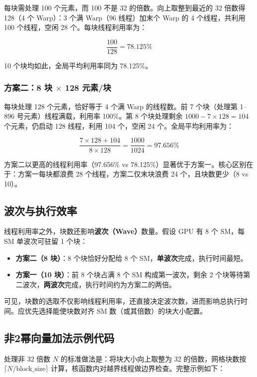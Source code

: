 每块需处理 100 个元素，而 100 不是 32 的倍数。向上取整到最近的 32 倍数得 128（4 个 Warp）：3 个满 Warp（96 线程）加末个 Warp 的 4 个线程，共利用 100 个线程，空闲 28 个。每块线程利用率为：

\[
\frac{100}{128} = 78.125\%
\]

10 个块均如此，全局平均利用率同为 78.125\%。

\subsubsection{方案二：8 块 $\times$ 128 元素/块}

每块处理 128 个元素，恰好等于 4 个满 Warp 的线程数。前 7 个块（处理第 1--896 号元素）线程满载，利用率 100\%。第 8 个块处理剩余 $1000 - 7 \times 128 = 104$ 个元素，仍启动 128 线程，利用 104 个，空闲 24 个。全局平均利用率为：

\[
\frac{7 \times 128 + 104}{8 \times 128} = \frac{1000}{1024} = 97.656\%
\]

方案二以更高的线程利用率（97.656\% vs 78.125\%）显著优于方案一。核心区别在于：方案一每块都浪费 28 个线程，方案二仅末块浪费 24 个，且块数更少（8 vs 10）。

\subsection{波次与执行效率}

线程利用率之外，块数还影响\textbf{波次（Wave）}数量。假设 GPU 有 8 个 SM，每 SM 单波次可驻留 1 个块：

\begin{itemize}
    \item \textbf{方案二（8 块）}：8 个块恰好分配给 8 个 SM，\textbf{单波次}完成，执行时间最短。
    \item \textbf{方案一（10 块）}：前 8 个块占满 8 个 SM 构成第一波次，剩余 2 个块等待第二波次，\textbf{两波次}完成，执行时间约为方案二的两倍。
\end{itemize}

可见，块数的选取不仅影响线程利用率，还直接决定波次数，进而影响总执行时间。应优先选择能使块数对齐 SM 数（或其倍数）的块大小配置。

\subsection{非2幂向量加法示例代码}

处理非 32 倍数 $N$ 的标准做法是：将块大小向上取整为 32 的倍数，网格块数按 $\lceil N / \text{block\_size} \rceil$ 计算，核函数内对越界线程做边界检查。完整示例如下：

